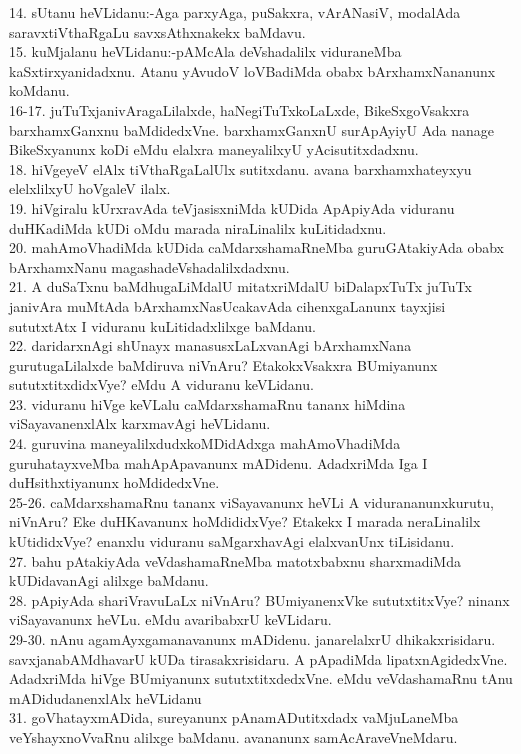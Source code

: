 \documentclass{article}
\begin{document}
14. sUtanu heVLidanu:-Aga parxyAga, puSakxra, vArANasiV, modalAda saravxtiVthaRgaLu savxsAthxnakekx baMdavu.\\
15. kuMjalanu heVLidanu:-pAMcAla deVshadalilx viduraneMba kaSxtirxyanidadxnu. Atanu yAvudoV loVBadiMda obabx bArxhamxNananunx koMdanu.\\
16-17. juTuTxjanivAragaLilalxde, haNegiTuTxkoLaLxde, BikeSxgoVsakxra barxhamxGanxnu baMdidedxVne. barxhamxGanxnU surApAyiyU Ada nanage BikeSxyanunx koDi eMdu elalxra maneyalilxyU yAcisutitxdadxnu.\\
18. hiVgeyeV elAlx tiVthaRgaLalUlx sutitxdanu. avana barxhamxhateyxyu elelxlilxyU hoVgaleV ilalx.\\
19. hiVgiralu kUrxravAda teVjasisxniMda kUDida ApApiyAda viduranu duHKadiMda kUDi oMdu marada niraLinalilx kuLitidadxnu.\\
20. mahAmoVhadiMda kUDida caMdarxshamaRneMba guruGAtakiyAda obabx bArxhamxNanu magashadeVshadalilxdadxnu.\\
21. A duSaTxnu baMdhugaLiMdalU mitatxriMdalU biDalapxTuTx juTuTx janivAra muMtAda bArxhamxNasUcakavAda cihenxgaLanunx tayxjisi sututxtAtx I viduranu kuLitidadxlilxge baMdanu.\\
22. daridarxnAgi shUnayx manasusxLaLxvanAgi bArxhamxNana gurutugaLilalxde baMdiruva niVnAru? EtakokxVsakxra BUmiyanunx sututxtitxdidxVye? eMdu A viduranu keVLidanu.\\
23. viduranu hiVge keVLalu caMdarxshamaRnu tananx hiMdina viSayavanenxlAlx karxmavAgi heVLidanu.\\
24. guruvina maneyalilxdudxkoMDidAdxga mahAmoVhadiMda guruhatayxveMba mahApApavanunx mADidenu. AdadxriMda Iga I duHsithxtiyanunx hoMdidedxVne.\\
25-26. caMdarxshamaRnu tananx viSayavanunx heVLi A vidurananunxkurutu, niVnAru? Eke duHKavanunx hoMdididxVye? Etakekx I marada neraLinalilx kUtididxVye? enanxlu viduranu saMgarxhavAgi elalxvanUnx tiLisidanu.\\
27. bahu pAtakiyAda veVdashamaRneMba matotxbabxnu sharxmadiMda kUDidavanAgi alilxge baMdanu.\\
28. pApiyAda shariVravuLaLx niVnAru? BUmiyanenxVke sututxtitxVye? ninanx viSayavanunx heVLu. eMdu avaribabxrU keVLidaru.\\
29-30. nAnu agamAyxgamanavanunx mADidenu. janarelalxrU dhikakxrisidaru. savxjanabAMdhavarU kUDa tirasakxrisidaru. A pApadiMda lipatxnAgidedxVne. AdadxriMda hiVge BUmiyanunx sututxtitxdedxVne. eMdu veVdashamaRnu tAnu mADidudanenxlAlx heVLidanu\\
31.  goVhatayxmADida, sureyanunx pAnamADutitxdadx vaMjuLaneMba veYshayxnoVvaRnu alilxge baMdanu. avananunx samAcAraveVneMdaru.\\
\end{document}
